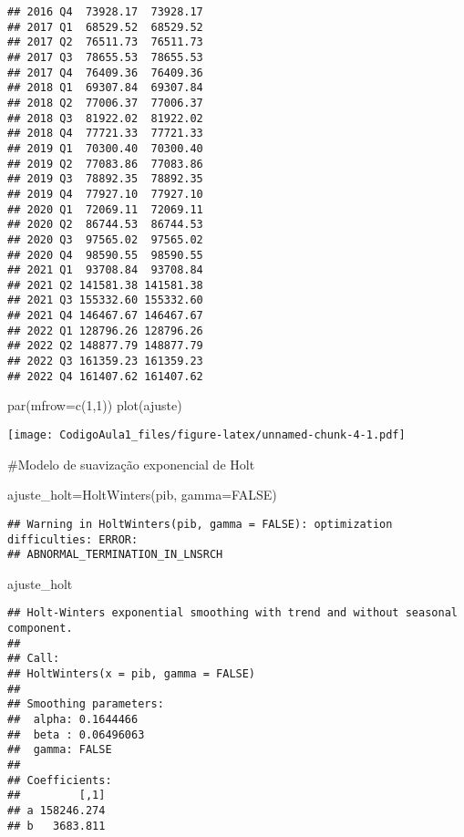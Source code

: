\documentclass[
]{article}
\newenvironment{Shaded}{\begin{snugshade}}{\end{snugshade}}
\newcommand{\AttributeTok}[1]{\textcolor[rgb]{0.77,0.63,0.00}{#1}}
\newcommand{\ConstantTok}[1]{\textcolor[rgb]{0.00,0.00,0.00}{#1}}
\newcommand{\DecValTok}[1]{\textcolor[rgb]{0.00,0.00,0.81}{#1}}
\newcommand{\FunctionTok}[1]{\textcolor[rgb]{0.00,0.00,0.00}{#1}}
\newcommand{\NormalTok}[1]{#1}
\newcommand{\OtherTok}[1]{\textcolor[rgb]{0.56,0.35,0.01}{#1}}
\begin{document}
\begin{verbatim}
## 2016 Q4  73928.17  73928.17
## 2017 Q1  68529.52  68529.52
## 2017 Q2  76511.73  76511.73
## 2017 Q3  78655.53  78655.53
## 2017 Q4  76409.36  76409.36
## 2018 Q1  69307.84  69307.84
## 2018 Q2  77006.37  77006.37
## 2018 Q3  81922.02  81922.02
## 2018 Q4  77721.33  77721.33
## 2019 Q1  70300.40  70300.40
## 2019 Q2  77083.86  77083.86
## 2019 Q3  78892.35  78892.35
## 2019 Q4  77927.10  77927.10
## 2020 Q1  72069.11  72069.11
## 2020 Q2  86744.53  86744.53
## 2020 Q3  97565.02  97565.02
## 2020 Q4  98590.55  98590.55
## 2021 Q1  93708.84  93708.84
## 2021 Q2 141581.38 141581.38
## 2021 Q3 155332.60 155332.60
## 2021 Q4 146467.67 146467.67
## 2022 Q1 128796.26 128796.26
## 2022 Q2 148877.79 148877.79
## 2022 Q3 161359.23 161359.23
## 2022 Q4 161407.62 161407.62
\end{verbatim}

\begin{Shaded}
\begin{Highlighting}[]
\FunctionTok{par}\NormalTok{(}\AttributeTok{mfrow=}\FunctionTok{c}\NormalTok{(}\DecValTok{1}\NormalTok{,}\DecValTok{1}\NormalTok{))}
\FunctionTok{plot}\NormalTok{(ajuste)}
\end{Highlighting}
\end{Shaded}

\texttt{[image: CodigoAula1\_files/figure-latex/unnamed-chunk-4-1.pdf]}

\#Modelo de suavização exponencial de Holt

\begin{Shaded}
\begin{Highlighting}[]
\NormalTok{ajuste\_holt}\OtherTok{=}\FunctionTok{HoltWinters}\NormalTok{(pib, }\AttributeTok{gamma=}\ConstantTok{FALSE}\NormalTok{)}
\end{Highlighting}
\end{Shaded}

\begin{verbatim}
## Warning in HoltWinters(pib, gamma = FALSE): optimization difficulties: ERROR:
## ABNORMAL_TERMINATION_IN_LNSRCH
\end{verbatim}

\begin{Shaded}
\begin{Highlighting}[]
\NormalTok{ajuste\_holt}
\end{Highlighting}
\end{Shaded}

\begin{verbatim}
## Holt-Winters exponential smoothing with trend and without seasonal component.
## 
## Call:
## HoltWinters(x = pib, gamma = FALSE)
## 
## Smoothing parameters:
##  alpha: 0.1644466
##  beta : 0.06496063
##  gamma: FALSE
## 
## Coefficients:
##         [,1]
## a 158246.274
## b   3683.811
\end{verbatim}
\end{document}
